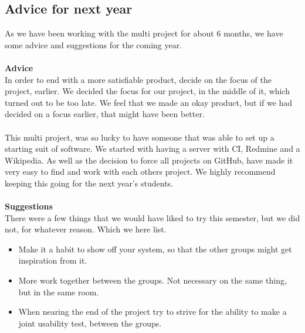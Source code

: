 \subsection{Advice for next year}
As we have been working with the multi project for about 6 months, we have some advice and suggestions for the coming year.\\
\\
\textbf{Advice}\\
In order to end with a more satisfiable product, decide on the focus of the project, earlier. We decided the focus for our project, in the middle of it, which turned out to be too late. We feel that we made an okay product, but if we had decided on a focus earlier, that might have been better.\\
\\
This multi project, was so lucky to have someone that was able to set up a starting suit of software. We started with having a server with CI, Redmine and a Wikipedia. As well as the decision to force all projects on GitHub, have made it very easy to find and work with each others project. We highly recommend keeping this going for the next year's students.\\
\\
\textbf{Suggestions}\\
There were a few things that we would have liked to try this semester, but we did not, for whatever reason. Which we here list.

\begin{itemize}
	\item Make it a habit to show off your system, so that the other groups might get inspiration from it.
	\item More work together between the groups. Not necessary on the same thing, but in the same room.
	\item When nearing the end of the project try to strive for the ability to make a joint usability test, between the groups.
\end{itemize}


